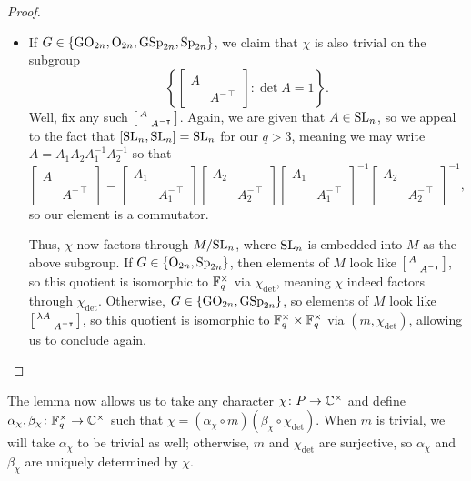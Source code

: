 \begin{proof}
\begin{itemize}
        \item If $G\in\{\mathrm{GO}_{2n},\mathrm{O}_{2n},\mathrm{GSp}_{2n},\mathrm{Sp}_{2n}\}$, we claim that $\chi$ is also trivial on the subgroup
        \[\left\{\begin{bmatrix}
            A \\ & A^{-\intercal}
        \end{bmatrix}:\det A=1\right\}.\]
        Well, fix any such $\begin{bsmallmatrix}
            A \\ & A^{-\intercal}
        \end{bsmallmatrix}$. Again, we are given that $A\in\mathrm{SL}_n$, so we appeal to the fact that $[\mathrm{SL}_{n},\mathrm{SL}_{n}]=\mathrm{SL}_{n}$ for our $q>3$, meaning we may write $A=A_1A_2A_1^{-1}A_2^{-1}$ so that
        \[\begin{bmatrix}
            A \\ & A^{-\intercal}
        \end{bmatrix}=\begin{bmatrix}
            A_1 \\ & A_1^{-\intercal}
        \end{bmatrix}\begin{bmatrix}
            A_2 \\ & A_2^{-\intercal}
        \end{bmatrix}\begin{bmatrix}
            A_1 \\ & A_1^{-\intercal}
        \end{bmatrix}^{-1}\begin{bmatrix}
            A_2 \\ & A_2^{-\intercal}
        \end{bmatrix}^{-1},\]
        so our element is a commutator.

        Thus, $\chi$ now factors through $M/\mathrm{SL}_n$, where $\mathrm{SL}_n$ is embedded into $M$ as the above subgroup. If $G\in\{\mathrm{O}_{2n},\mathrm{Sp}_{2n}\}$, then elements of $M$ look like $\begin{bsmallmatrix}
            A \\ & A^{-\intercal}
        \end{bsmallmatrix}$, so this quotient is isomorphic to $\mathbb F_q^\times$ via $\chi_{\det}$, meaning $\chi$ indeed factors through $\chi_{\det}$. Otherwise, $G\in\{\mathrm{GO}_{2n},\mathrm{GSp}_{2n}\}$, so elements of $M$ look like $\begin{bsmallmatrix}
            \lambda A \\ & A^{-\intercal}
        \end{bsmallmatrix}$, so this quotient is isomorphic to $\mathbb F_q^\times\times\mathbb F_q^\times$ via $(m,\chi_{\det})$, allowing us to conclude again.
        \qedhere
    \end{itemize}
\end{proof}
The lemma now allows us to take any character $\chi\colon P\to\mathbb C^\times$ and define $\alpha_\chi,\beta_\chi\colon\mathbb F_q^\times\to\mathbb C^\times$ such that $\chi=(\alpha_\chi\circ m)(\beta_\chi\circ\chi_{\det})$. When $m$ is trivial, we will take $\alpha_\chi$ to be trivial as well; otherwise, $m$ and $\chi_{\det}$ are surjective, so $\alpha_\chi$ and $\beta_\chi$ are uniquely determined by $\chi$.


